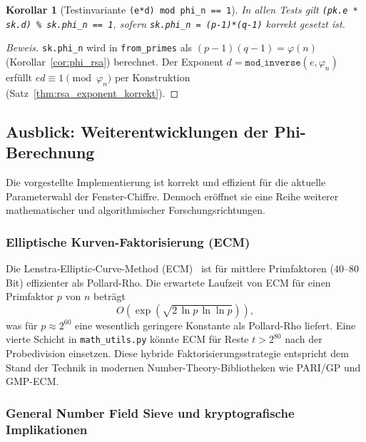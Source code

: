 ﻿\documentclass[12pt, a4paper]{article}
\theoremstyle{plain}
\newtheorem{corollary}[theorem]{Korollar}
\theoremstyle{definition}
\theoremstyle{remark}
\newenvironment{myproof}[1][Beweis]{%
  \begin{proof}[#1]
}{%
  \end{proof}
}
\begin{document}
\begin{corollary}[Testinvariante \texttt{(e*d) mod phi\_n == 1}]
\label{cor:test_invariante}
  In allen Tests gilt \texttt{(pk.e * sk.d) \% sk.phi\_n == 1},
  sofern \texttt{sk.phi\_n = (p-1)*(q-1)} korrekt gesetzt ist.
\end{corollary}

\begin{myproof}
  \texttt{sk.phi\_n} wird in \texttt{from\_primes} als
  $(p-1)(q-1) = \varphi(n)$ (Korollar~\ref{cor:phi_rsa}) berechnet.
  Der Exponent $d = \texttt{mod\_inverse}(e, \varphi_n)$ erf\"ullt
  $ed \equiv 1 \pmod{\varphi_n}$ per Konstruktion
  (Satz~\ref{thm:rsa_exponent_korrekt}).
\end{myproof}

\subsection{Ausblick: Weiterentwicklungen der Phi-Berechnung}
\label{subsec:phi_ausblick}

Die vorgestellte Implementierung ist korrekt und effizient f\"ur die
aktuelle Parameterwahl der Fenster-Chiffre. Dennoch er\"offnet sie
eine Reihe weiterer mathematischer und algorithmischer
Forschungsrichtungen.

\subsubsection{Elliptische Kurven-Faktorisierung (ECM)}

Die Lenstra-Elliptic-Curve-Method (ECM)~\cite{lenstra1987factoring}
ist f\"ur mittlere Primfaktoren ($40$--$80$ Bit) effizienter als
Pollard-Rho. Die erwartete Laufzeit von ECM f\"ur einen Primfaktor
$p$ von $n$ betr\"agt
\[
  O\!\left(\exp\!\left(\sqrt{2\,\ln p\,\ln\ln p}\right)\right),
\]
was f\"ur $p \approx 2^{60}$ eine wesentlich geringere Konstante
als Pollard-Rho liefert. Eine vierte Schicht in \texttt{math\_utils.py}
k\"onnte ECM f\"ur Reste $t > 2^{80}$ nach der Probedivision
einsetzen. Diese hybride Faktorisierungsstrategie entspricht dem
Stand der Technik in modernen Number-Theory-Bibliotheken wie
PARI/GP und GMP-ECM.

\subsubsection{General Number Field Sieve und kryptografische Implikationen}
\end{document}
